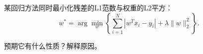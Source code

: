 某回归方法同时最小化残差的L1范数与权重的L2平方：
\[
w^*=\arg\min_w\left\{\sum_{i=1}^N|w^Tx_i-y_i|+\lambda\|w\|_2^2\right\}.
\]


预期它有什么性质？解释原因。
